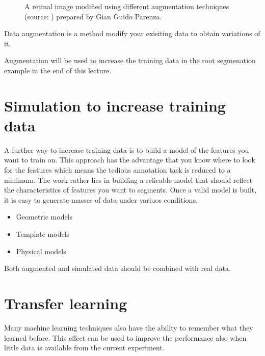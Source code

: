 \documentclass[letterpaper,10pt,english]{sphinxmanual}
\begin{document}
\begin{figure}[htbp]
\centering
\capstart

\noindent{}
\caption{A retinal image modified using different augmentation techniques (source: ) prepared by Gian Guido Parenza.}\label{\detokenize{ML4NeutronImageSegmentation:id14}}\end{figure}

Data augmentation is a method modify your exisiting data to obtain variations of it.



Augmentation will be used to increase the training data in the root segmenation example in the end of this lecture.


\section{Simulation to increase training data}
\label{\detokenize{ML4NeutronImageSegmentation:simulation-to-increase-training-data}}
A further way to increase training data is to build a model of the features you want to train on. This approach has the advantage that you know where to look for the features which means the tedious annotation task is reduced to a minimum. The work rather lies in building a relieable model that should reflect the characteristics of features you want to segments. Once a valid model is built, it is easy to generate masses of data under variuos conditions.
\begin{itemize}
\item {} 
Geometric models

\item {} 
Template models

\item {} 
Physical models

\end{itemize}

Both augmented and simulated data should be combined with real data.


\section{Transfer learning}
\label{\detokenize{ML4NeutronImageSegmentation:transfer-learning}}
Many machine learning techniques also have the ability to remember what they learned before. This effect can be used to improve the performance also when little data is available from the current experiment.
\end{document}
